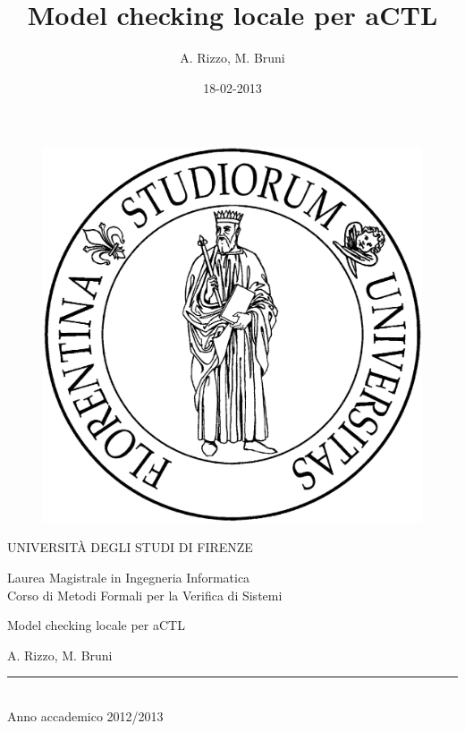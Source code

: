 \documentclass[a4paper,10pt]{article}
\title{Model checking locale per aCTL}
\author{A. Rizzo, M. Bruni}
\date{18-02-2013}
\begin{document}

\begin{titlepage}
\thispagestyle{empty}
\topmargin=1cm
\large

\begin{figure}[ht]
\centering
\includegraphics[scale=0.075]{img/Stemma.jpg}
\end{figure}

\begin{center}

UNIVERSITÀ DEGLI STUDI DI FIRENZE
\vspace{0.5cm}

Laurea Magistrale in Ingegneria Informatica
\\
\normalsize
Corso di Metodi Formali per la Verifica di Sistemi
\vspace{4cm}

\begin{huge}
Model checking locale per aCTL
\end{huge}

\vspace{0.5cm}

A. Rizzo, M. Bruni

\vspace{6cm}
\rule{6cm}{.4pt}
\\
Anno accademico 2012/2013
\end{center}
\end{titlepage}
\end{document}
